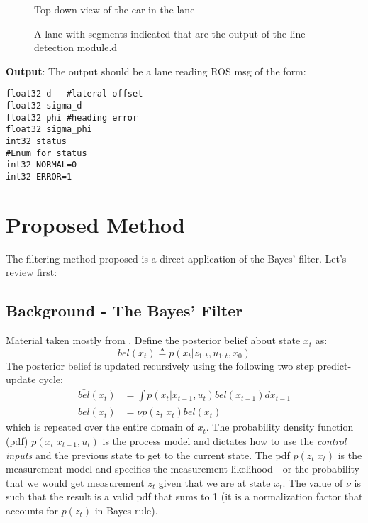 \documentclass[12pt]{article}
\begin{document}
\begin{figure}[htb]
\centering
\def\svgwidth{10cm}

\caption{Top-down view of the car in the lane}
\label{fig:lane}
\end{figure}

\begin{figure}[htb]
\centering
\def\svgwidth{3cm}

\caption{A lane with segments indicated that are the output of the line detection module.d}
\label{fig:segments}
\end{figure}

\vspace{0.5cm}
{\bf Output}: The output should be a lane reading ROS msg of the form:
\begin{verbatim}
float32 d   #lateral offset
float32 sigma_d
float32 phi #heading error
float32 sigma_phi
int32 status
#Enum for status
int32 NORMAL=0
int32 ERROR=1
\end{verbatim}


\section{Proposed Method}

The filtering method proposed is a direct application of the Bayes' filter. Let's review first:

\subsection{Background - The Bayes' Filter}

Material taken mostly from \cite{prob_robotics}.
Define the posterior belief about state $x_t$ as:
\begin{equation}
bel(x_t)\triangleq p(x_t|z_{1:t},u_{1:t},x_0)
\end{equation}
The posterior belief is updated recursively using the following two step predict-update cycle:
\begin{equation}
\begin{split}
\bar{bel}(x_t)&=\int p(x_t|x_{t-1},u_t)bel(x_{t-1})dx_{t-1} \\
bel(x_t)&=\nu p(z_t|x_t)\bar{bel}(x_t)
\end{split}
\label{eq:bayes}
\end{equation}
which is repeated over the entire domain of $x_t$. The probability density function (pdf) $p(x_t|x_{t-1},u_t)$ is the process model and dictates how to use the \textit{control inputs} and the previous state to get to the current state. The pdf $p(z_t|x_t)$ is the measurement model and specifies the measurement likelihood - or the probability that we would get measurement $z_t$ given that we are at state $x_t$. The value of $\nu$ is such that the result is a valid pdf that sums to 1 (it is a normalization factor that accounts for $p(z_t)$ in Bayes rule).
\end{document}
